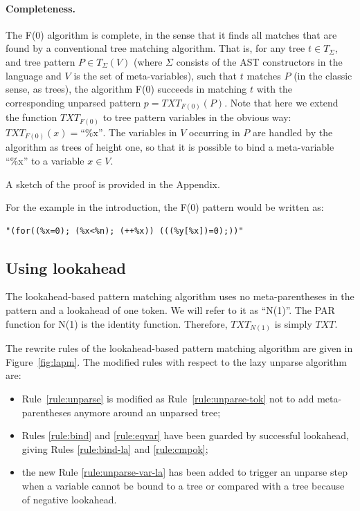 \documentclass{sigplanconf}
\begin{document}
\paragraph{Completeness.}
The F(0) algorithm is complete, in the sense that it finds all matches
that are found by a conventional tree matching algorithm. That is, for
any tree $t \in T_\Sigma$, and tree pattern $P \in T_\Sigma(V)$ (where
$\Sigma$ consists of the AST constructors in the language and $V$ is
the set of meta-variables), such that $t$ matches $P$ (in the classic
sense, as trees), the algorithm F(0) succeeds in matching $t$ with the
corresponding unparsed pattern $p=TXT_{F(0)}(P)$. Note that here we
extend the function $TXT_{F(0)}$ to tree pattern variables in the
obvious way: $TXT_{F(0)}(x) = \mbox{``\%x''}$. The variables in $V$
occurring in $P$ are handled by the algorithm as trees of height one,
so that it is possible to bind a meta-variable ``\%x'' to a variable
$x \in V$.

A sketch of the proof is provided in the Appendix.

For the example in the introduction, the F(0) pattern would be written
as:
\begin{verbatim} 
"(for((%x=0); (%x<%n); (++%x)) (((%y[%x])=0);))"
\end{verbatim}

\subsection{Using lookahead}
The lookahead-based pattern matching algorithm uses no
meta-parentheses in the pattern and a lookahead of one token. We will
refer to it as ``N(1)''.  The PAR function for N(1) is the identity
function.  Therefore, $TXT_{N(1)}$ is simply $TXT$.

The rewrite rules of the lookahead-based pattern matching algorithm
are given in Figure~\ref{fig:lapm}. The modified rules with respect
to the lazy unparse algorithm are:
\begin{itemize}
\item Rule~\ref{rule:unparse} is modified as Rule~\ref{rule:unparse-tok}
not to add meta-parentheses anymore around an unparsed tree;
\item Rules \ref{rule:bind} and \ref{rule:eqvar}
have been guarded by successful lookahead, giving Rules
\ref{rule:bind-la} and \ref{rule:cmpok};
\item the new Rule \ref{rule:unparse-var-la} has been added to trigger
an unparse step when a variable cannot be bound to a tree or compared
with a tree because of negative lookahead.
\end{itemize}
\end{document}
